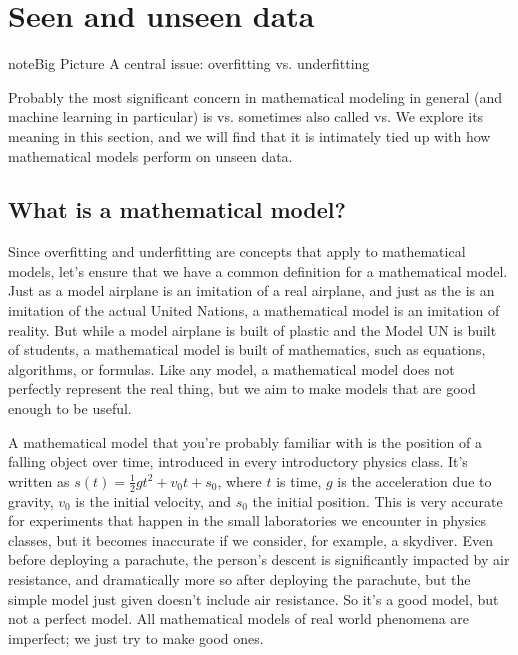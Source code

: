 \documentclass[letterpaper,10pt,english]{jupyterBook}
\begin{document}
\section{Seen and unseen data}
\label{\detokenize{chapter-17-machine-learning:seen-and-unseen-data}}
\begin{sphinxadmonition}{note}{Big Picture \sphinxhyphen{} A central issue: overfitting vs. underfitting}

\sphinxAtStartPar
Probably the most significant concern in mathematical modeling in general (and machine learning in particular) is  vs.  sometimes also called  vs.   We explore its meaning in this section, and we will find that it is intimately tied up with how mathematical models perform on unseen data.
\end{sphinxadmonition}


\subsection{What is a mathematical model?}
\label{\detokenize{chapter-17-machine-learning:what-is-a-mathematical-model}}
\sphinxAtStartPar
Since overfitting and underfitting are concepts that apply to mathematical models, let’s ensure that we have a common definition for a mathematical model.  Just as a model airplane is an imitation of a real airplane, and just as the  is an imitation of the actual United Nations, a mathematical model is an imitation of reality.  But while a model airplane is built of plastic and the Model UN is built of students, a mathematical model is built of mathematics, such as equations, algorithms, or formulas.  Like any model, a mathematical model does not perfectly represent the real thing, but we aim to make models that are good enough to be useful.

\sphinxAtStartPar
A mathematical model that you’re probably familiar with is the position of a falling object over time, introduced in every introductory physics class.  It’s written as \(s(t)=\frac12gt^2+v_0t+s_0\), where \(t\) is time, \(g\) is the acceleration due to gravity, \(v_0\) is the initial velocity, and \(s_0\) the initial position.  This is very accurate for experiments that happen in the small laboratories we encounter in physics classes, but it becomes inaccurate if we consider, for example, a skydiver.  Even before deploying a parachute, the person’s descent is significantly impacted by air resistance, and dramatically more so after deploying the parachute, but the simple model just given doesn’t include air resistance.  So it’s a good model, but not a perfect model.  All mathematical models of real world phenomena are imperfect; we just try to make good ones.
\end{document}
